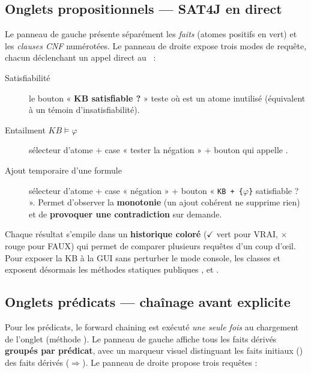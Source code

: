 \subsection{Onglets propositionnels — SAT4J en direct}

Le panneau de gauche présente séparément les \emph{faits} (atomes positifs en
vert) et les \emph{clauses CNF} numérotées. Le panneau de droite expose trois
modes de requête, chacun déclenchant un appel direct au ~:

\begin{description}
  \item[Satisfiabilité] le bouton « \textbf{KB satisfiable ?} » teste
         où  est un atome inutilisé
        (équivalent à un témoin d'insatisfiabilité).
  \item[Entailment $KB \models \varphi$] sélecteur d'atome + case
        « tester la négation » + bouton qui appelle .
  \item[Ajout temporaire d'une formule] sélecteur d'atome + case « négation »
        + bouton « \texttt{KB + \{$\varphi$\}} satisfiable ? ». Permet d'observer
        la \textbf{monotonie} (un ajout cohérent ne supprime rien) et de
        \textbf{provoquer une contradiction} sur demande.
\end{description}

\noindent Chaque résultat s'empile dans un \textbf{historique coloré}
($\checkmark$ vert pour VRAI, $\times$ rouge pour FAUX) qui permet de comparer
plusieurs requêtes d'un coup d'œil. Pour exposer la KB à la GUI sans
perturber le mode console, les classes  et
 exposent désormais les méthodes statiques
publiques ,  et
.

\subsection{Onglets prédicats — chaînage avant explicite}

Pour les prédicats, le forward chaining est exécuté \emph{une seule fois} au
chargement de l'onglet (méthode ). Le panneau de gauche
affiche tous les faits dérivés \textbf{groupés par prédicat}, avec un marqueur
visuel distinguant les faits initiaux () des faits dérivés
($\Rightarrow$). Le panneau de droite propose trois requêtes :

